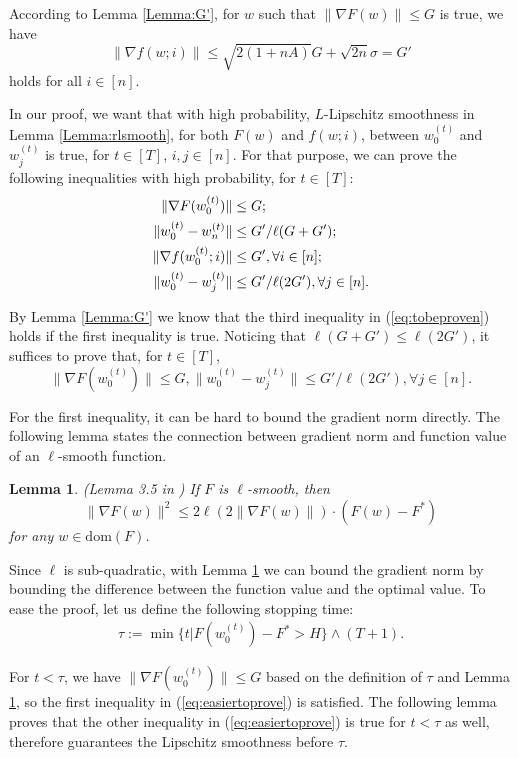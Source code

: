 \documentclass{article} %
\theoremstyle{plain}
\newtheorem{Lemma}[theorem]{Lemma}
\theoremstyle{definition}
\theoremstyle{remark}
\begin{document}
According to Lemma \ref{Lemma:G'}, for $w$ such that $\|\nabla F(w)\|\leq G$ is true, we have $$\|\nabla f(w;i)\|\leq \sqrt{2(1+nA)}G+\sqrt{2n}\sigma=G'$$ holds for all $i\in[n]$.

In our proof, we want that with high probability, $L$-Lipschitz smoothness in Lemma \ref{Lemma:rlsmooth}, for both $F(w)$ and $f(w;i)$, between $w^{(t)}_0$ and $w^{(t)}_j$ is true, for $t\in[T]$, $i, j\in[n]$. For that purpose, we can prove the following inequalities with high probability, for $t\in[T]$:
\begin{align}
    \|\nabla F(w^{(t)}_0)\|& \leq G; \notag \\
    \|w^{(t)}_0-w^{(t)}_n\|& \leq G'/\ell(G+G');\notag \\
    \|\nabla f(w^{(t)}_0;i)\| &\leq G', \forall i\in[n]; \notag \\
    \|w^{(t)}_0-w^{(t)}_j\|&\leq G'/\ell(2G'),\forall j\in[n].\label{eq:tobeproven}
\end{align}

By Lemma \ref{Lemma:G'} we know that the third inequality in (\ref{eq:tobeproven}) holds if the first inequality is true. Noticing that $\ell(G+G')\leq \ell(2G')$, it suffices to prove that, for $t\in[T]$,
\begin{equation} 
\label{eq:easiertoprove}
\|\nabla F(w^{(t)}_0)\| \leq G, \|w^{(t)}_0-w^{(t)}_j\|\leq G'/\ell(2G'), \forall j\in[n].
\end{equation}

For the first inequality, it can be hard to bound the gradient norm directly. The following lemma states the connection between gradient norm and function value of an $\ell$-smooth function. 

\begin{Lemma} (Lemma 3.5 in \citet{li2023convex})
\label{Lemma:gradienttodiff}
    If $F$ is $\ell$-smooth, then $$\|\nabla F(w)\|^2\leq 2\ell(2\|\nabla F(w)\|)\cdot (F(w)-F^*)$$ for any $w\in$$\mathrm{dom}(F)$.
\end{Lemma}

Since $\ell$ is sub-quadratic, with Lemma \ref{Lemma:gradienttodiff} we can bound the gradient norm by bounding the difference between the function value and the optimal value. To ease the proof, let us define the following stopping time:
\begin{align*}
    \tau := \min\{t|F(w^{(t)}_0)-F^*>H\}\wedge (T+1).
\end{align*}

For $t<\tau$, we have $\|\nabla F(w^{(t)}_0)\|\leq G$ based on the definition of $\tau$ and Lemma \ref{Lemma:gradienttodiff}, so the first inequality in (\ref{eq:easiertoprove}) is satisfied. The following lemma proves that the other inequality in (\ref{eq:easiertoprove}) is true for $t<\tau$ as well, therefore guarantees the Lipschitz smoothness before $\tau$.
\end{document}
